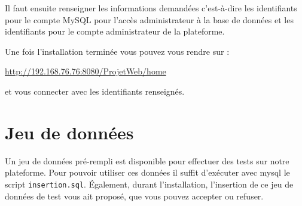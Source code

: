 Il faut ensuite renseigner les informations demandées c'est-à-dire les identifiants pour le
compte MySQL pour l'accès administrateur à la base de données et les identifiants pour le compte
administrateur de la plateforme.

Une fois l'installation terminée vous pouvez vous rendre sur :
\begin{center}
    \url{http://192.168.76.76:8080/ProjetWeb/home}
\end{center}
et vous connecter avec les identifiants renseignés.

\section{Jeu de données}

Un jeu de données pré-rempli est disponible pour effectuer des tests sur notre plateforme.
Pour pouvoir utiliser ces données il suffit d'exécuter avec mysql le script \verb:insertion.sql:.
Également, durant l'installation, l'insertion de ce jeu de données de test vous ait proposé, que
vous pouvez accepter ou refuser.

